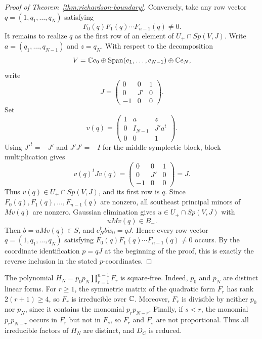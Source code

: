 \begin{proof}[Proof of Theorem~\ref{thm:richardson-boundary}]
Conversely, take any row vector \(q=(1,q_1,\ldots,q_N)\) satisfying
\[
F_0(q)F_1(q)\cdots F_{n-1}(q)\ne0.
\]
It remains to realize \(q\) as the first row of an element of \(U_+\cap Sp(V,J)\). Write \(a=(q_1,\ldots,q_{N-1})\) and \(z=q_N\). With respect to the decomposition
\[
V=\mathbb{C} e_0\oplus \operatorname{Span}(e_1,\ldots,e_{N-1})\oplus \mathbb{C} e_N,
\]
write
\[
J=\begin{pmatrix}
0&0&1\\
0&J'&0\\
-1&0&0
\end{pmatrix}.
\]
Set
\[
v(q)=
\begin{pmatrix}
1&a&z\\
0&I_{N-1}&J'a^t\\
0&0&1
\end{pmatrix}.
\]
Using \(J'^t=-J'\) and \(J'J'=-I\) for the middle symplectic block, block multiplication gives
\[
v(q)^tJv(q)=
\begin{pmatrix}
0&0&1\\
0&J'&0\\
-1&0&0
\end{pmatrix}
=J.
\]
Thus \(v(q)\in U_+\cap Sp(V,J)\), and its first row is \(q\). Since \(F_0(q),F_1(q),\ldots,F_{n-1}(q)\) are nonzero, all southeast principal minors of \(Mv(q)\) are nonzero. Gaussian elimination gives \(u\in U_+\cap Sp(V,J)\) with
\[
uMv(q)\in B_-.
\]
Then \(b=uMv(q)\in S\), and \(e_N^tb\dot w_0=qJ\). Hence every row vector \(q=(1,q_1,\ldots,q_N)\) satisfying \(F_0(q)F_1(q)\cdots F_{n-1}(q)\ne0\) occurs. By the coordinate identification \(p=qJ\) at the beginning of the proof, this is exactly the reverse inclusion in the stated \(p\)-coordinates.
\end{proof}

\begin{rmk}\label{rmk:square-free-boundary}
The polynomial \(H_N=p_0p_N\prod_{r=1}^{n-1}F_r\) is square-free. Indeed, \(p_0\) and \(p_N\) are distinct linear forms. For \(r\ge1\), the symmetric matrix of the quadratic form \(F_r\) has rank \(2(r+1)\ge4\), so \(F_r\) is irreducible over \(\mathbb{C}\). Moreover, \(F_r\) is divisible by neither \(p_0\) nor \(p_N\), since it contains the monomial \(p_rp_{N-r}\). Finally, if \(s<r\), the monomial \(p_rp_{N-r}\) occurs in \(F_r\) but not in \(F_s\), so \(F_r\) and \(F_s\) are not proportional. Thus all irreducible factors of \(H_N\) are distinct, and \(D_C\) is reduced.
\end{rmk}

